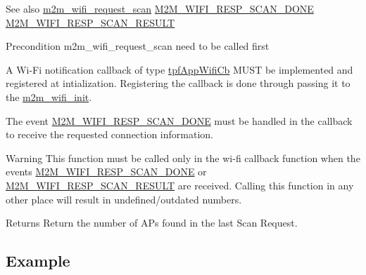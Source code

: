\begin{DoxySeeAlso}{See also}
\hyperlink{group__WifiRequestScanFn_ga499dfa24a19c2e84776aeabedf897135}{m2m\+\_\+wifi\+\_\+request\+\_\+scan} \hyperlink{group__WlanEnums_gga064de09dec1d5e88ed8d075fa40f57dead835febbe18b7e3cc6ce4693951354fe}{M2\+M\+\_\+\+W\+I\+F\+I\+\_\+\+R\+E\+S\+P\+\_\+\+S\+C\+A\+N\+\_\+\+D\+O\+NE} \hyperlink{group__WlanEnums_gga064de09dec1d5e88ed8d075fa40f57deadfb48e88c3a8e5f9dac634d62d3f53e5}{M2\+M\+\_\+\+W\+I\+F\+I\+\_\+\+R\+E\+S\+P\+\_\+\+S\+C\+A\+N\+\_\+\+R\+E\+S\+U\+LT} 
\end{DoxySeeAlso}
\begin{DoxyPrecond}{Precondition}
m2m\+\_\+wifi\+\_\+request\+\_\+scan need to be called first
\begin{DoxyItemize}
\item A Wi-\/\+Fi notification callback of type \hyperlink{group__WlanEnums_gac5302f32839285fe8375c159087aa8a1}{tpf\+App\+Wifi\+Cb} M\+U\+ST be implemented and registered at intialization. Registering the callback is done through passing it to the \hyperlink{group__WifiInitFn_ga73c734812e844d96d860c4e93e9daf35}{m2m\+\_\+wifi\+\_\+init}.
\item The event \hyperlink{group__WlanEnums_gga064de09dec1d5e88ed8d075fa40f57dead835febbe18b7e3cc6ce4693951354fe}{M2\+M\+\_\+\+W\+I\+F\+I\+\_\+\+R\+E\+S\+P\+\_\+\+S\+C\+A\+N\+\_\+\+D\+O\+NE} must be handled in the callback to receive the requested connection information. 
\end{DoxyItemize}
\end{DoxyPrecond}
\begin{DoxyWarning}{Warning}
This function must be called only in the wi-\/fi callback function when the events \hyperlink{group__WlanEnums_gga064de09dec1d5e88ed8d075fa40f57dead835febbe18b7e3cc6ce4693951354fe}{M2\+M\+\_\+\+W\+I\+F\+I\+\_\+\+R\+E\+S\+P\+\_\+\+S\+C\+A\+N\+\_\+\+D\+O\+NE} or \hyperlink{group__WlanEnums_gga064de09dec1d5e88ed8d075fa40f57deadfb48e88c3a8e5f9dac634d62d3f53e5}{M2\+M\+\_\+\+W\+I\+F\+I\+\_\+\+R\+E\+S\+P\+\_\+\+S\+C\+A\+N\+\_\+\+R\+E\+S\+U\+LT} are received. Calling this function in any other place will result in undefined/outdated numbers. 
\end{DoxyWarning}
\begin{DoxyReturn}{Returns}
Return the number of AP\textquotesingle{}s found in the last Scan Request.
\end{DoxyReturn}
\hypertarget{group__WifiEnableMonitorModeFn_Example}{}\subsection{Example}\label{group__WifiEnableMonitorModeFn_Example}
